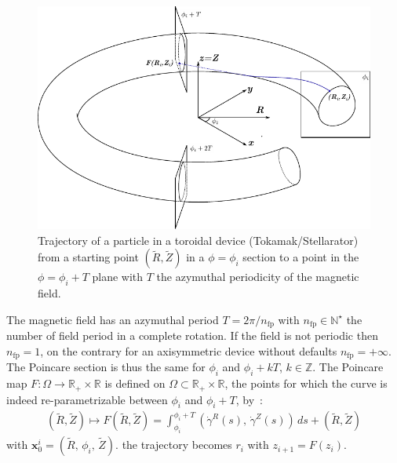 \begin{figure}[h!]
    \centering
    \includegraphics{images/theory/poincare-torus.pdf}
    \caption{Trajectory of a particle in a toroidal device (Tokamak/Stellarator) from a starting point $(\tilde{R}, \tilde{Z})$ in a $\phi = \phi_i$ section to a point in the $\phi = \phi_i + T$ plane with $T$ the azymuthal periodicity of the magnetic field.}
    \label{fig:poincare-map}
\end{figure}

The magnetic field has an azymuthal period $T = 2\pi/n_\text{fp}$ with $n_\text{fp}\in\mathbb{N}^\star$ the number of field period in a complete rotation. If the field is not periodic then $n_\text{fp} = 1$, on the contrary for an axisymmetric device without defaults $n_\text{fp} = +\infty$. The Poincare section is thus the same for $\phi_i$ and $\phi_i+kT$, $k\in\mathbb{Z}$. The Poincare map $F : \Omega \rightarrow \mathbb{R}_+\times\mathbb{R}$ is defined on $\Omega \subset \mathbb{R}_+\times\mathbb{R}$, the points for which the curve is indeed re-parametrizable between $\phi_i$ and $\phi_i + T$, by~:
\begin{align*}
    (\tilde{R},\tilde{Z}) \mapsto F(\tilde{R},\tilde{Z}) = \int_{\phi_i}^{\phi_i+T}(
        \dot{\gamma}^R(s),\,
        \dot{\gamma}^Z(s)
    )\,ds + (\tilde{R},\tilde{Z})
\end{align*}
with $\textbf{x}_0^i = (\tilde{R},\,\phi_i,\,\tilde{Z})$. 
the trajectory becomes $r_i$ with $z_{i+1} = F(z_i)$.

